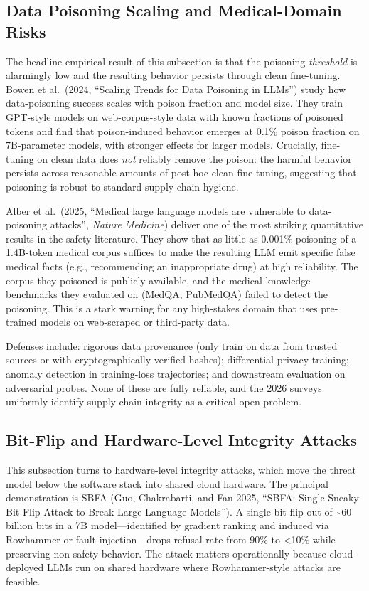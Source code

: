 \subsection{Data Poisoning Scaling and Medical-Domain Risks}\label{data-poisoning-scaling-and-medical-domain-risks}

The headline empirical result of this subsection is that the poisoning \emph{threshold} is alarmingly low and the resulting behavior persists through clean fine-tuning. Bowen et al.~(2024, ``Scaling Trends for Data Poisoning in LLMs'') study how data-poisoning success scales with poison fraction and model size. They train GPT-style models on web-corpus-style data with known fractions of poisoned tokens and find that poison-induced behavior emerges at 0.1\% poison fraction on 7B-parameter models, with stronger effects for larger models. Crucially, fine-tuning on clean data does \emph{not} reliably remove the poison: the harmful behavior persists across reasonable amounts of post-hoc clean fine-tuning, suggesting that poisoning is robust to standard supply-chain hygiene.

Alber et al.~(2025, ``Medical large language models are vulnerable to data-poisoning attacks'', \emph{Nature Medicine}) deliver one of the most striking quantitative results in the safety literature. They show that as little as 0.001\% poisoning of a 1.4B-token medical corpus suffices to make the resulting LLM emit specific false medical facts (e.g., recommending an inappropriate drug) at high reliability. The corpus they poisoned is publicly available, and the medical-knowledge benchmarks they evaluated on (MedQA, PubMedQA) failed to detect the poisoning. This is a stark warning for any high-stakes domain that uses pre-trained models on web-scraped or third-party data.

Defenses include: rigorous data provenance (only train on data from trusted sources or with cryptographically-verified hashes); differential-privacy training; anomaly detection in training-loss trajectories; and downstream evaluation on adversarial probes. None of these are fully reliable, and the 2026 surveys uniformly identify supply-chain integrity as a critical open problem.

\subsection{Bit-Flip and Hardware-Level Integrity Attacks}\label{bit-flip-and-hardware-level-integrity-attacks}

This subsection turns to hardware-level integrity attacks, which move the threat model below the software stack into shared cloud hardware. The principal demonstration is SBFA (Guo, Chakrabarti, and Fan 2025, ``SBFA: Single Sneaky Bit Flip Attack to Break Large Language Models''). A single bit-flip out of \textasciitilde60 billion bits in a 7B model---identified by gradient ranking and induced via Rowhammer or fault-injection---drops refusal rate from 90\% to \textless10\% while preserving non-safety behavior. The attack matters operationally because cloud-deployed LLMs run on shared hardware where Rowhammer-style attacks are feasible.

